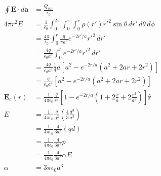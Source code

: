 \documentclass{article}
\renewcommand{\vec}[1]{\boldsymbol{\mathbf{#1}}}
\newcommand{\uvec}[1]{\hat{\vec{#1}}}
\newcommand{\ke}{\frac{1}{4 \pi \epsilon_0}}
\begin{document}
\begin{align*}
  \oint \vec{E} \cdot d \vec{a} & = \frac{Q_\text{enc}}{\epsilon_0}                                                                                 \\
  4 \pi r^2 E                   & = \frac{1}{\epsilon_0} \int_0^{2 \pi} \int_0^\pi \int_0^r \rho(r') r'^2 \sin \theta \,d r' \,d \theta \,d \phi    \\
                                & = \frac{4 \pi}{\epsilon_0} \int_0^r \frac{q}{\pi a^3} e^{-2 r' / a} r'^2 \,d r'                                   \\
                                & = \frac{4 q}{\epsilon_0 a^3} \int_0^r e^{-2 r' / a} r'^2 \,d r'                                                   \\
                                & = \frac{4 q}{\epsilon_0 a^3} \frac{1}{4} a \left[ a^2 - e^{-2 r / a} (a^2 + 2 a r + 2 r^2) \right]                \\
                                & = \frac{q}{\epsilon_0 a^2} \left[ a^2 - e^{-2 r / a} (a^2 + 2 a r + 2 r^2) \right]                                \\
  \vec{E}_e(r)                  & = \ke \frac{q}{r^2} \left[ 1 - e^{-2 r / a} \left( 1 + 2 \frac{r}{a} + 2 \frac{r^2}{a^2} \right) \right] \uvec{r} \\
  E                             & = \ke \frac{q}{d^2} \left( \frac{4}{3} \frac{d^3}{a^3} \right)                                                    \\
                                & = \ke \frac{4}{3 a^3} (q d)                                                                                       \\
                                & = \ke \frac{4}{3 a^3} p                                                                                           \\
                                & = \ke \frac{4}{3 a^3} \alpha E                                                                                    \\
  \alpha                        & = 3 \pi \epsilon_0 a^3
\end{align*}

\subsection{}
\end{document}
